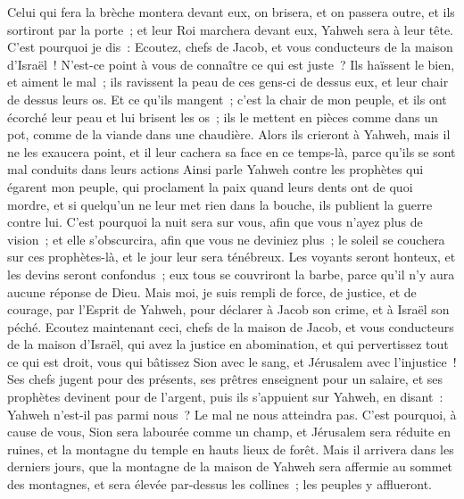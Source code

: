 \begin{multicols}{2}
Celui qui fera la brèche montera devant eux, on brisera, et on passera outre, et ils sortiront par la porte~; et leur Roi marchera devant eux, Yahweh sera à leur tête.
\VerseOne{}C'est pourquoi je dis~: Ecoutez, chefs de Jacob, et vous conducteurs de la maison d'Israël~! N'est-ce point à vous de connaître ce qui est juste~?
Ils haïssent le bien, et aiment le mal~; ils ravissent la peau de ces gens-ci de dessus eux, et leur chair de dessus leurs os.
 Et ce qu'ils mangent~; c'est la chair de mon peuple, et ils ont écorché leur peau et lui brisent les os~; ils le mettent en pièces comme dans un pot, comme de la viande dans une chaudière.
Alors ils crieront à Yahweh, mais il ne les exaucera point, et il leur cachera sa face en ce temps-là, parce qu'ils se sont mal conduits dans leurs actions
Ainsi parle Yahweh contre les prophètes qui égarent mon peuple, qui proclament la paix quand leurs dents ont de quoi mordre, et si quelqu'un ne leur met rien dans la bouche, ils publient la guerre contre lui.
C'est pourquoi la nuit sera sur vous, afin que vous n'ayez plus de vision~; et elle s'obscurcira, afin que vous ne deviniez plus~; le soleil se couchera sur ces prophètes-là, et le jour leur sera ténébreux.
Les voyants seront honteux, et les devins seront confondus~; eux tous se couvriront la barbe, parce qu'il n'y aura aucune réponse de Dieu.
Mais moi, je suis rempli de force, de justice, et de courage, par l'Esprit de Yahweh, pour déclarer à Jacob son crime, et à Israël son péché.
Ecoutez maintenant ceci, chefs de la maison de Jacob, et vous conducteurs de la maison d'Israël, qui avez la justice en abomination, et qui pervertissez tout ce qui est droit,
vous qui bâtissez Sion avec le sang, et Jérusalem avec l'injustice~!
Ses chefs jugent pour des présents, ses prêtres enseignent pour un salaire, et ses prophètes devinent pour de l'argent, puis ils s'appuient sur Yahweh, en disant~: Yahweh n'est-il pas parmi nous~? Le mal ne nous atteindra pas.
C'est pourquoi, à cause de vous, Sion sera labourée comme un champ, et Jérusalem sera réduite en ruines, et la montagne du temple en hauts lieux de forêt.
\VerseOne{}Mais il arrivera dans les derniers jours, que la montagne de la maison de Yahweh sera affermie au sommet des montagnes, et sera élevée par-dessus les collines~; les peuples y afflueront.

\end{multicols}
